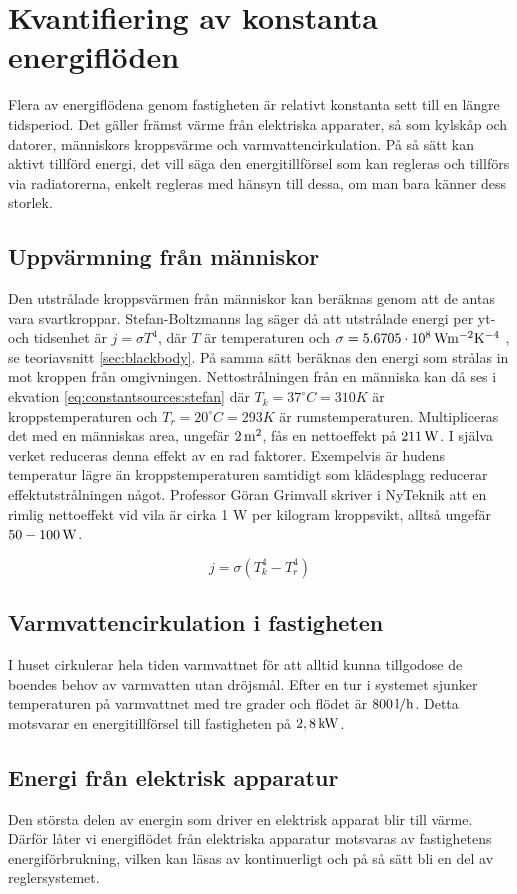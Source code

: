 \section{Kvantifiering av konstanta energiflöden}

Flera av energiflödena genom fastigheten är relativt konstanta sett till en längre tidsperiod. Det gäller främst värme från elektriska apparater, så som kylskåp och datorer, människors kroppsvärme och varmvattencirkulation. På så sätt kan aktivt tillförd energi, det vill säga den energitillförsel som kan regleras och tillförs via radiatorerna, enkelt regleras med hänsyn till dessa, om man bara känner dess storlek.

\subsection{Uppvärmning från människor}
Den utstrålade kroppsvärmen från människor kan beräknas genom att de antas vara svartkroppar. Stefan-Boltzmanns lag säger då att utstrålade energi per yt- och tidsenhet är $j=\sigma T^4$, där $T$ är temperaturen och $\sigma=\unit[5.6705\cdot 10^8]{Wm^{-2}K^{-4}}$ \cite{physicshandbook}, se teoriavsnitt \ref{sec:blackbody}. På samma sätt beräknas den energi som strålas in mot kroppen från omgivningen. Nettostrålningen från en människa kan då ses i ekvation \eqref{eq:constantsources:stefan} där $T_k=37^{\circ}C=310K$ är kroppstemperaturen och $T_r=20^{\circ}C=293K$ är rumstemperaturen. Multipliceras det med en människas area, ungefär $\unit[2]{m^2}$, fås en nettoeffekt på $\unit[211]{W}$. I själva verket reduceras denna effekt av en rad faktorer. Exempelvis är hudens temperatur lägre än kroppstemperaturen samtidigt som klädesplagg reducerar effektutstrålningen något. Professor Göran Grimvall skriver i NyTeknik att en rimlig nettoeffekt vid vila är cirka 1 W per kilogram kroppsvikt, alltså ungefär $\unit[50-100]{W}$\cite{Grimvall}.

\begin{equation}
\label{eq:constantsources:stefan}
j=\sigma \left( T_k^4 - T_r^4 \right)
\end{equation}
\noindent

\subsection{Varmvattencirkulation i fastigheten}
I huset cirkulerar hela tiden varmvattnet för att alltid kunna tillgodose de boendes behov av varmvatten utan dröjsmål. Efter en tur i systemet sjunker temperaturen på varmvattnet med tre grader och flödet är $\unit[800]{l/h}$. Detta motsvarar en energitillförsel till fastigheten på $\unit[2,8]{kW}$.

\subsection{Energi från elektrisk apparatur}
Den största delen av energin som driver en elektrisk apparat blir till värme. Därför låter vi energiflödet från elektriska apparatur motsvaras av fastighetens energiförbrukning, vilken kan läsas av kontinuerligt och på så sätt bli en del av reglersystemet.

